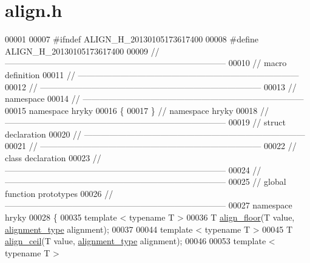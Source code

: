 \hypertarget{align_8h_source}{\section{align.\-h}
}

\begin{DoxyCode}
00001 
00007 \textcolor{preprocessor}{#ifndef ALIGN\_H\_20130105173617400}
00008 \textcolor{preprocessor}{}\textcolor{preprocessor}{#define ALIGN\_H\_20130105173617400}
00009 \textcolor{preprocessor}{}\textcolor{comment}{//
      ------------------------------------------------------------------------------}
00010 \textcolor{comment}{// macro definition}
00011 \textcolor{comment}{//
      ------------------------------------------------------------------------------}
00012 \textcolor{comment}{//
      ------------------------------------------------------------------------------}
00013 \textcolor{comment}{// namespace}
00014 \textcolor{comment}{//
      ------------------------------------------------------------------------------}
00015 \textcolor{keyword}{namespace }hryky
00016 \{
00017 \} \textcolor{comment}{// namespace hryky}
00018 \textcolor{comment}{//
      ------------------------------------------------------------------------------}
00019 \textcolor{comment}{// struct declaration}
00020 \textcolor{comment}{//
      ------------------------------------------------------------------------------}
00021 \textcolor{comment}{//
      ------------------------------------------------------------------------------}
00022 \textcolor{comment}{// class declaration}
00023 \textcolor{comment}{//
      ------------------------------------------------------------------------------}
00024 \textcolor{comment}{//
      ------------------------------------------------------------------------------}
00025 \textcolor{comment}{// global function prototypes}
00026 \textcolor{comment}{//
      ------------------------------------------------------------------------------}
00027 \textcolor{keyword}{namespace }hryky
00028 \{
00035     \textcolor{keyword}{template} < \textcolor{keyword}{typename} T >
00036     T \hyperlink{namespacehryky_a84803d86a3bb217481dd0a180734fb8f}{align_floor}(T value, \hyperlink{namespacehryky_aee1af251193c2d308aaa68ef7e36a540}{alignment_type} alignment);
00037 
00044     \textcolor{keyword}{template} < \textcolor{keyword}{typename} T >
00045     T \hyperlink{namespacehryky_a7ddd0f39f2f0953fe7e3cbaedaf98644}{align_ceil}(T value, \hyperlink{namespacehryky_aee1af251193c2d308aaa68ef7e36a540}{alignment_type} alignment);
00046     
00053     \textcolor{keyword}{template} < \textcolor{keyword}{typename} T >

\end{DoxyCode}
